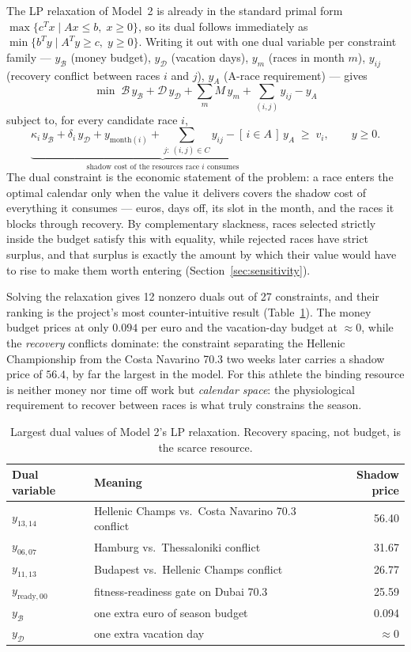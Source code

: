 \documentclass[11pt,a4paper]{article}
\begin{document}
The LP relaxation of Model~2 is already in the standard primal form
$\max\{c^{T}x \mid Ax \le b,\; x \ge 0\}$, so its dual follows immediately as
$\min\{b^{T}y \mid A^{T}y \ge c,\; y \ge 0\}$. Writing it out with one dual
variable per constraint family --- $y_\mathcal{B}$ (money budget), $y_\mathcal{D}$
(vacation days), $y_m$ (races in month $m$), $y_{ij}$ (recovery conflict between
races $i$ and $j$), $y_A$ (A-race requirement) --- gives
\[
\min\; \mathcal{B}\,y_\mathcal{B} + \mathcal{D}\,y_\mathcal{D}
      + \sum_m M\,y_m + \sum_{(i,j)} y_{ij} - y_A
\]
subject to, for every candidate race $i$,
\[
\underbrace{\kappa_i\, y_\mathcal{B} + \delta_i\, y_\mathcal{D}
 + y_{\text{month}(i)} + \sum_{j:\,(i,j)\in C} y_{ij}
 - [\,i \in A\,]\, y_A}_{\text{shadow cost of the resources race } i \text{ consumes}}
\;\ge\; v_i ,
\qquad y \ge 0 .
\]
The dual constraint is the economic statement of the problem: a race enters the
optimal calendar only when the value it delivers covers the shadow cost of
everything it consumes --- euros, days off, its slot in the month, and the
races it blocks through recovery. By complementary slackness, races selected
strictly inside the budget satisfy this with equality, while rejected races
have strict surplus, and that surplus is exactly the amount by which their
value would have to rise to make them worth entering
(Section~\ref{sec:sensitivity}).

Solving the relaxation gives 12 nonzero duals out of 27 constraints, and their
ranking is the project's most counter-intuitive result
(Table~\ref{tab:m2duals}). The money budget prices at only $0.094$ per euro and
the vacation-day budget at $\approx 0$, while the \emph{recovery} conflicts
dominate: the constraint separating the Hellenic Championship from the Costa
Navarino 70.3 two weeks later carries a shadow price of $56.4$, by far the
largest in the model. For this athlete the binding resource is neither money
nor time off work but \emph{calendar space}: the physiological requirement to
recover between races is what truly constrains the season.

\begin{table}[h]
\centering\small
\begin{tabular}{llr}
\toprule
Dual variable & Meaning & Shadow price\\
\midrule
$y_{13,14}$ & Hellenic Champs vs.\ Costa Navarino 70.3 conflict & 56.40\\
$y_{06,07}$ & Hamburg vs.\ Thessaloniki conflict & 31.67\\
$y_{11,13}$ & Budapest vs.\ Hellenic Champs conflict & 26.77\\
$y_{\text{ready},00}$ & fitness-readiness gate on Dubai 70.3 & 25.59\\
$y_\mathcal{B}$ & one extra euro of season budget & 0.094\\
$y_\mathcal{D}$ & one extra vacation day & $\approx 0$\\
\bottomrule
\end{tabular}
\caption{Largest dual values of Model 2's LP relaxation. Recovery spacing, not
budget, is the scarce resource.}
\label{tab:m2duals}
\end{table}
\end{document}
